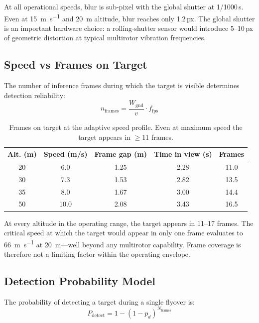 \documentclass[10pt,a4paper]{article}
\begin{document}
At all operational speeds, blur is sub-pixel with the global shutter at 1/1000\,s. Even at \SI{15}{\metre\per\second} and \SI{20}{\metre} altitude, blur reaches only 1.2\,px. The global shutter is an important hardware choice: a rolling-shutter sensor would introduce 5--10\,px of geometric distortion at typical multirotor vibration frequencies.

\subsection{Speed vs Frames on Target}

The number of inference frames during which the target is visible determines detection reliability:
\begin{equation}\label{eq:frames}
  n_{\mathrm{frames}} = \frac{W_{\mathrm{gnd}}}{v} \cdot f_{\mathrm{fps}}
\end{equation}

\begin{table}[ht]
  \centering
  \caption{Frames on target at the adaptive speed profile. Even at maximum speed the target appears in $\geq$11 frames.}\label{tab:frames}
  \begin{tabular}{@{}c c c c c@{}}
    \toprule
    \textbf{Alt. (m)} & \textbf{Speed (m/s)} & \textbf{Frame gap (m)} & \textbf{Time in view (s)} & \textbf{Frames} \\
    \midrule
    20 &  6.0 & 1.25 & 2.28 & 11.0 \\
    30 &  7.3 & 1.53 & 2.82 & 13.5 \\
    35 &  8.0 & 1.67 & 3.00 & 14.4 \\
    50 & 10.0 & 2.08 & 3.43 & 16.5 \\
    \bottomrule
  \end{tabular}
\end{table}

At every altitude in the operating range, the target appears in 11--17 frames. The critical speed at which the target would appear in only one frame evaluates to \SI{66}{\metre\per\second} at \SI{20}{\metre}---well beyond any multirotor capability. Frame coverage is therefore not a limiting factor within the operating envelope.

\subsection{Detection Probability Model}

The probability of detecting a target during a single flyover is:
\begin{equation}\label{eq:detect-prob}
    P_{\mathrm{detect}} = 1 - (1 - p_d)^{N_{\mathrm{frames}}}
\end{equation}
\end{document}
